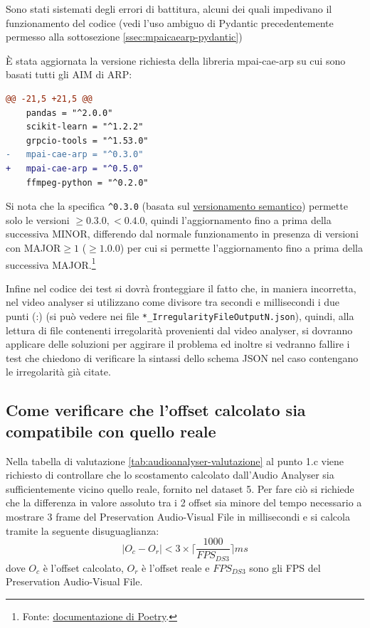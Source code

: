 Sono stati sistemati degli errori di battitura, alcuni dei quali impedivano il funzionamento del codice (vedi l'uso ambiguo di Pydantic precedentemente permesso alla sottosezione \ref{ssec:mpaicaearp-pydantic})

È stata aggiornata la versione richiesta della libreria mpai-cae-arp su cui sono basati tutti gli \ac{AIM} di \ac{ARP}:
\begin{lstlisting}[language=diff, caption={Aggiornamento della libreria \texttt{mpai-cae-arp} in Audio Analyser, file \texttt{pyproject.toml}}]
@@ -21,5 +21,5 @@ 
    pandas = "^2.0.0"
    scikit-learn = "^1.2.2"
    grpcio-tools = "^1.53.0"
-   mpai-cae-arp = "^0.3.0"
+   mpai-cae-arp = "^0.5.0"
    ffmpeg-python = "^0.2.0"
\end{lstlisting}
Si nota che la specifica \verb|^0.3.0| (basata sul \href{https://semver.org/lang/it/}{versionamento semantico}) permette solo le versioni $\ge0.3.0, <0.4.0$, quindi l'aggiornamento fino a prima della successiva MINOR, differendo dal normale funzionamento in presenza di versioni con MAJOR$\ge1$ ($\ge1.0.0$) per cui si permette l'aggiornamento fino a prima della successiva MAJOR.\footnote{Fonte: \href{https://python-poetry.org/docs/dependency-specification/\#caret-requirements}{documentazione di Poetry}.}

Infine nel codice dei test si dovrà fronteggiare il fatto che, in maniera incorretta, nel video analyser si utilizzano come divisore tra secondi e millisecondi i due punti (:) (si può vedere nei file \verb|*_IrregularityFileOutputN.json|), quindi, alla lettura di file contenenti irregolarità provenienti dal video analyser, si dovranno applicare delle soluzioni per aggirare il problema ed inoltre si vedranno fallire i test che chiedono di verificare la sintassi dello schema JSON nel caso contengano le irregolarità già citate.


\subsection{Come verificare che l'offset calcolato sia compatibile con quello reale} \label{ssec:audioanalyser-offset}   %
Nella tabella di valutazione \ref{tab:audioanalyser-valutazione} al punto 1.c viene richiesto di controllare che lo scostamento calcolato dall'Audio Analyser sia sufficientemente vicino quello reale, fornito nel dataset 5.
Per fare ciò si richiede che la differenza in valore assoluto tra i 2 offset sia minore del tempo necessario a mostrare 3 frame del Preservation Audio-Visual File in millisecondi e si calcola tramite la seguente disuguaglianza:
\begin{equation}
    |O_c - O_r| < 3 \times \big\lceil\frac{1000}{FPS_{DS3}}\big\rceil ms
\end{equation}
dove $O_c$ è l'offset calcolato, $O_r$ è l'offset reale e $FPS_{DS3}$ sono gli FPS del Preservation Audio-Visual File.


